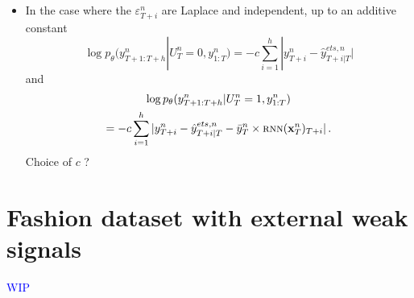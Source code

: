 \documentclass{article} %
\newcommand{\ts}{y}
\newcommand{\etspred}{\hat{y}}
\newcommand{\meants}{\Bar{\ts}}
\newcommand{\rnnmodel}{\textsc{rnn}}
\newcommand{\concatinput}{x}
\newcommand{\fullconcatinput}{{ \bf \concatinput}}
\newcommand{\numberts}{14000}
\begin{document}
{\begin{itemize}
\begin{multline*}
 = -c\sum_{i=1}^{h}(\ts^n_{T+i}  - \etspred^{ets,n}_{T+i|T} - \meants^n_T\times \rnnmodel(\fullconcatinput^n_T)_{T+i})^2\,.
\end{multline*}
Choice of $c$ ?
\item In the case where the  $\varepsilon^n_{T+i}$ are Laplace and independent, up to an additive constant
$$
\log p_\theta(\ts^n_{T+1:T+h}|U_T^n=0,\ts^n_{1:T}) = -c\sum_{i=1}^{h}|\ts^n_{T+i}  - \etspred^{ets,n}_{T+i|T}|
$$
and
\begin{multline*}
\log p_\theta(\ts^n_{T+1:T+h}|U_T^n=1,\ts^n_{1:T})\\
 = -c\sum_{i=1}^{h}|\ts^n_{T+i}  - \etspred^{ets,n}_{T+i|T} - \meants^n_T\times \rnnmodel(\fullconcatinput^n_T)_{T+i}|\,.
\end{multline*}
Choice of $c$ ?
\end{itemize}}

\section{Fashion dataset with external weak signals}
\label{sec:dataset}

\textcolor{blue}{WIP}
\end{document}
